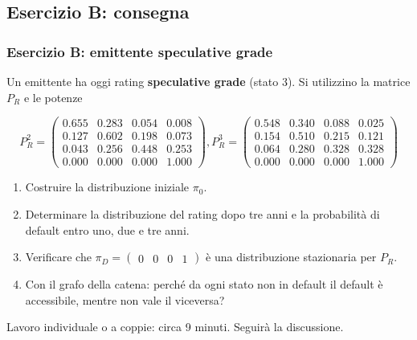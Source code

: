 \subsection{Esercizio B: consegna}%

\begin{frame}%
%

\frametitle{Esercizio B: emittente speculative grade}%
%

%


Un emittente ha oggi rating \textbf{speculative grade} (stato $3$). Si
utilizzino la matrice $P_{R}$ e le potenze

{\small
\[
P_{R}^{2} =
\begin{pmatrix}
0.655 & 0.283 & 0.054 & 0.008\\
0.127 & 0.602 & 0.198 & 0.073\\
0.043 & 0.256 & 0.448 & 0.253\\
0.000 & 0.000 & 0.000 & 1.000
\end{pmatrix}
, P_{R}^{3} =
\begin{pmatrix}
0.548 & 0.340 & 0.088 & 0.025\\
0.154 & 0.510 & 0.215 & 0.121\\
0.064 & 0.280 & 0.328 & 0.328\\
0.000 & 0.000 & 0.000 & 1.000
\end{pmatrix}
\]
}

\medskip

\begin{enumerate}
\item[1.] Costruire la distribuzione iniziale $\pi_{0}$.

\item[2.] Determinare la distribuzione del rating dopo tre anni e la
probabilit\`{a} di default entro uno, due e tre anni.

\item[3.] Verificare che $\pi_{D}=
\begin{pmatrix}
0 & 0 & 0 & 1
\end{pmatrix}
$ \`{e} una distribuzione stazionaria per $P_{R}$.

\item[4.] Con il grafo della catena: perch\'{e} da ogni stato non in default
il default \`{e} accessibile, mentre non vale il viceversa?
\end{enumerate}

\medskip

\begin{center}
{\small Lavoro individuale o a coppie: circa 9 minuti. Seguir\`{a} la
discussione.}
\end{center}

%

\transboxout
\end{frame}%

